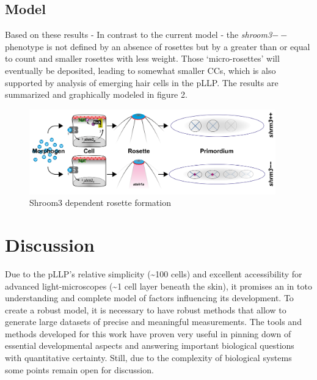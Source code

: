 \documentclass[11pt,singlespacinge,twoside]{reedthesis} %
\begin{document}
\hypertarget{model-2}{%
\section{Model}\label{model-2}}

Based on these results - In contrast to the current model - the \emph{shroom3}\(--\) phenotype is not defined by an absence of rosettes but by a greater than or equal to count and smaller rosettes with less weight. Those `micro-rosettes' will eventually be deposited, leading to somewhat smaller CCs, which is also supported by analysis of emerging hair cells in the pLLP. The results are summarized and graphically modeled in figure 2.


\begin{figure}

{\centering \includegraphics[width=0.95\textwidth]{figures/summary/CurrentModel_new-01} 

}

\caption[Shroom3 dependent rosette formation]{Shroom3 dependent rosette formation}\label{fig:summodel}
\end{figure}
\hypertarget{discussion}{%
\chapter{Discussion}\label{discussion}}

Due to the pLLP's relative simplicity (\textasciitilde{}100 cells) and excellent accessibility for advanced light-microscopes (\textasciitilde{}1 cell layer beneath the skin), it promises an in toto understanding and complete model of factors influencing its development.
To create a robust model, it is necessary to have robust methods that allow to generate large datasets of precise and meaningful measurements. The tools and methods developed for this work have proven very useful in pinning down of essential developmental aspects and answering important biological questions with quantitative certainty. Still, due to the complexity of biological systems some points remain open for discussion.
\end{document}
